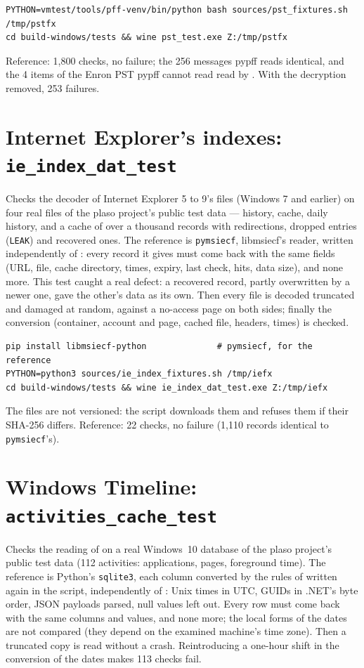 \documentclass[11pt,a4paper,oneside]{report}
\begin{document}
\begin{lstlisting}
PYTHON=vmtest/tools/pff-venv/bin/python bash sources/pst_fixtures.sh /tmp/pstfx
cd build-windows/tests && wine pst_test.exe Z:/tmp/pstfx
\end{lstlisting}

Reference: 1,800 checks, no failure; the 256 messages pypff reads identical,
and the 4 items of the Enron PST pypff cannot read read by \wac{}. With the
decryption removed, 253 failures.

\section{Internet Explorer's indexes: \texttt{ie\_index\_dat\_test}}

Checks the decoder of Internet Explorer 5 to 9's  files
(Windows 7 and earlier) on four real files of the plaso project's public test
data — history, cache, daily history, and a cache of over a thousand records
with redirections, dropped entries (\texttt{LEAK}) and recovered ones. The
reference is \texttt{pymsiecf}, libmsiecf's reader, written independently of
\wac{}: every record it gives must come back with the same fields (URL, file,
cache directory, times, expiry, last check, hits, data size), and none more.
This test caught a real defect: a recovered record, partly overwritten by a
newer one, gave the other's data as its own. Then every file is decoded
truncated and damaged at random, against a no-access page on both sides;
finally the conversion (container, account and page, cached file, headers,
times) is checked.

\begin{lstlisting}
pip install libmsiecf-python              # pymsiecf, for the reference
PYTHON=python3 sources/ie_index_fixtures.sh /tmp/iefx
cd build-windows/tests && wine ie_index_dat_test.exe Z:/tmp/iefx
\end{lstlisting}

The files are not versioned: the script downloads them and refuses them if
their SHA-256 differs. Reference: 22 checks, no failure (1,110 records
identical to \texttt{pymsiecf}'s).

\section{Windows Timeline: \texttt{activities\_cache\_test}}

Checks the reading of  on a real Windows~10
database of the plaso project's public test data (112 activities:
applications, pages, foreground time). The reference is Python's
\texttt{sqlite3}, each column converted by the rules of
 written again in the script, independently of
\wac{}: Unix times in UTC, GUIDs in .NET's byte order, JSON payloads parsed,
null values left out. Every row must come back with the same columns and
values, and none more; the local forms of the dates are not compared (they
depend on the examined machine's time zone). Then a truncated copy is read
without a crash. Reintroducing a one-hour shift in the conversion of the
dates makes 113 checks fail.
\end{document}
